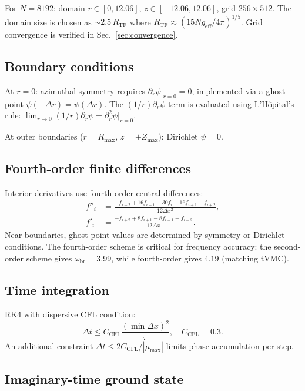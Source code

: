 \documentclass[aps,prl,onecolumn,superscriptaddress,longbibliography,nofootinbib]{revtex4-2}
\begin{document}
For $N=8192$: domain $r\in[0,12.06]$, $z\in[-12.06,12.06]$, grid
$256\times 512$.  The domain size is chosen as $\sim 2.5\,R_{\mathrm{TF}}$
where $R_{\mathrm{TF}}\approx(15Ng_{\mathrm{eff}}/4\pi)^{1/5}$.
Grid convergence is verified in Sec.~\ref{sec:convergence}.

\subsection{Boundary conditions}

At $r=0$: azimuthal symmetry requires $\partial_r\psi|_{r=0}=0$,
implemented via a ghost point $\psi(-\Delta r)=\psi(\Delta r)$.  The
$(1/r)\partial_r\psi$ term is evaluated using L'H\^opital's rule:
$\lim_{r\to 0}(1/r)\partial_r\psi = \partial_r^2\psi|_{r=0}$.

At outer boundaries ($r=R_{\max}$, $z=\pm Z_{\max}$): Dirichlet
$\psi=0$.

\subsection{Fourth-order finite differences}

Interior derivatives use fourth-order central differences:
\begin{align}
f''_i &= \frac{-f_{i-2}+16f_{i-1}-30f_i+16f_{i+1}-f_{i+2}}
{12\Delta x^2},\\
f'_i &= \frac{-f_{i+2}+8f_{i+1}-8f_{i-1}+f_{i-2}}{12\Delta x}.
\end{align}
Near boundaries, ghost-point values are determined by symmetry or
Dirichlet conditions.  The fourth-order scheme is critical for
frequency accuracy: the second-order scheme gives
$\omega_{\mathrm{br}}=3.99$, while fourth-order gives $4.19$
(matching tVMC).

\subsection{Time integration}

RK4 with dispersive CFL condition:
\begin{equation}
\Delta t \leq C_{\mathrm{CFL}}\frac{(\min\Delta x)^2}{\pi},
\quad C_{\mathrm{CFL}}=0.3.
\end{equation}
An additional constraint $\Delta t\leq 2C_{\mathrm{CFL}}/|\mu_{\max}|$
limits phase accumulation per step.

\subsection{Imaginary-time ground state}
\end{document}
